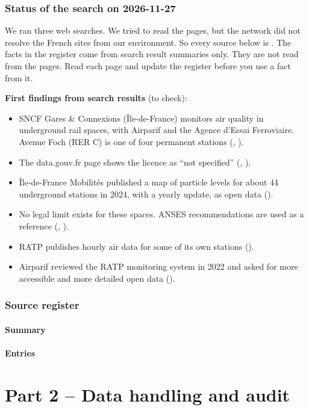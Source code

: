 \documentclass[11pt]{article}
\begin{document}
\section{Status of the search on 2026-11-27}
We ran three web searches. We tried to read the pages, but the network did not resolve the French sites from our environment.
So every source below is \sToCheck. The facts in the register come from search result summaries only. They are not read from the pages.
Read each page and update the register before you use a fact from it.

\textbf{First findings from search results} (to check):
\begin{itemize}
  \item SNCF Gares \& Connexions (Île-de-France) monitors air quality in underground rail spaces, with Airparif and the Agence d'Essai Ferroviaire. Avenue Foch (RER C) is one of four permanent stations (, ).
  \item The data.gouv.fr page shows the licence as ``not specified'' (, ).
  \item Île-de-France Mobilités published a map of particle levels for about 44 underground stations in 2024, with a yearly update, as open data ().
  \item No legal limit exists for these spaces. ANSES recommendations are used as a reference (, ).
  \item RATP publishes hourly air data for some of its own stations ().
  \item Airparif reviewed the RATP monitoring system in 2022 and asked for more accessible and more detailed open data ().
\end{itemize}

\section{Source register}
\subsection{Summary}
\srcsummary
\subsection{Entries}
\srcentries

\part*{Part 2 -- Data handling and audit}
\end{document}
